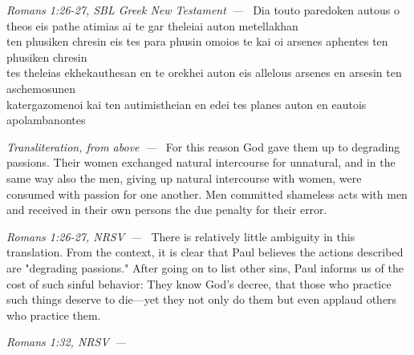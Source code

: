\documentclass[10pt]{article}
\let\oldquote\quote
\let\endoldquote\endquote
\renewenvironment{quote}[2][]
  {\if\relax\detokenize{#1}\relax
     \def\quoteauthor{#2}%
   \else
     \def\quoteauthor{#2~---~#1}%
   \fi
   \oldquote}
  {\par\nobreak\smallskip\hfill\textit{\quoteauthor}%
   \endoldquote\addvspace{\bigskipamount}}
\begin{document}
\begin{quote}{Romans 1:26-27, SBL Greek New Testament}
\end{quote}
\begin{quote}{Transliteration, from above}
Dia touto paredoken autous o theos eis pathe atimias ai te gar theleiai auton metellakhan\\ ten phusiken chresin eis tes para phusin omoios te kai oi arsenes aphentes ten phusiken chresin\\tes theleias ekhekauthesan en te orekhei auton eis allelous arsenes en arsesin ten aschemosunen\\katergazomenoi kai ten autimistheian en edei tes planes auton en eautois apolambanontes
\end{quote}
\begin{quote}{Romans 1:26-27, NRSV}
For this reason God gave them up to degrading passions. Their women exchanged natural intercourse for unnatural, and in the same way also the men, giving up natural intercourse with women, were consumed with passion for one another. Men committed shameless acts with men and received in their own persons the due penalty for their error.
\end{quote}
There is relatively little ambiguity in this translation. %
From the context, it is clear that Paul believes the actions described are "degrading passions." After going on to list other sins, Paul informs us of the cost of such sinful behavior:
\begin{quote}{Romans 1:32, NRSV}
They know God’s decree, that those who practice such things deserve to die—yet they not only do them but even applaud others who practice them.
\end{quote}
\end{document}
